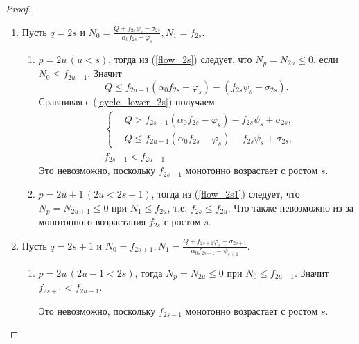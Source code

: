 \begin{proof}
    \begin{enumerate}
        \item Пусть \(q = 2s \) и \( N_0 = \frac{Q + f_{2s} \psi_s - \sigma_{2s}}{\alpha_0 f_{2s} - \varphi_s}, N_1 = f_{2s}\).
        \begin{enumerate}
            \item \(p = 2u \, (u < s)\), тогда из (\ref{flow_2s}) следует, что \( N_p = N_{2u} \leq 0 \), если \(N_0 \leq f_{2u-1}\). Значит 
            \begin{equation*}
                Q \leq f_{2u-1} ( \alpha_0 f_{2s} - \varphi_s ) - (f_{2s} \psi_s - \sigma_{2s}).
            \end{equation*}
            Сравнивая с (\ref{cycle_lower_2s}) получаем
            \begin{equation*}
                \begin{split}
                & \left\{ \begin{split}
                    & Q > f_{2s-1} ( \alpha_0 f_{2s} - \varphi_s ) - f_{2s} \psi_s + \sigma_{2s}, \\
                    & Q \leq f_{2u-1} ( \alpha_0 f_{2s} - \varphi_s ) - f_{2s} \psi_s + \sigma_{2s},
                \end{split} \right. \\
                & f_{2s-1} < f_{2u-1}
                \end{split}
            \end{equation*}
            Это невозможно, поскольку \(f_{2s-1}\) монотонно возрастает с ростом \(s\).

            \item \(p = 2u+1 \, (2u < 2s-1)\), тогда из (\ref{flow_2s1}) следует, что \( N_p = N_{2u+1} \leq 0 \) при \(N_1 \leq f_{2u}\), т.е. \(f_{2s} \leq f_{2u} \). Что также невозможно из-за монотонного возрастания \(f_{2s}\) с ростом \(s\). 
        \end{enumerate}

        \item Пусть \( q = 2s+1 \) и \( N_0 = f_{2s+1}, N_1 = \frac{Q + f_{2s+1} \varphi_s - \sigma_{2s+1}}{ \alpha_0 f_{2s+1} - \psi_{s+1} } \).
        \begin{enumerate}
            \item \(p = 2u \, (2u-1 < 2s)\), тогда \( N_p = N_{2u} \leq 0 \) при \(N_0 \leq f_{2u-1}\). Значит \(f_{2s+1} < f_{2u-1} \). 
            
            Это невозможно, поскольку \(f_{2s-1}\) монотонно возрастает с ростом \(s\).


\end{enumerate}
\end{enumerate}
\end{proof}

